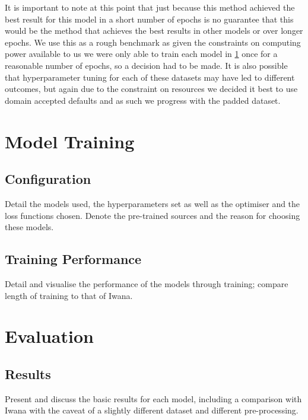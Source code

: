 \documentclass[12pt]{article}
\numberwithin{equation}{section}
\numberwithin{figure}{section}
\begin{document}
It is important to note at this point that just because this method achieved the best result for this model in a short number of epochs is no guarantee that this would be the method that achieves the best results in other models or over longer epochs. We use this as a rough benchmark as given the constraints on computing power available to us we were only able to train each model in \cref{sec:Model_Training} once for a reasonable number of epochs, so a decision had to be made. It is also possible that hyperparameter tuning for each of these datasets may have led to different outcomes, but again due to the constraint on resources we decided it best to use domain accepted defaults and as such we progress with the padded dataset.

\section{Model Training} 
\label{sec:Model_Training} 
\subsection{Configuration} 
\label{sub:Configuration} 
Detail the models used, the hyperparameters set as well as the optimiser and the loss functions chosen. Denote the pre-trained sources and the reason for choosing these models.
\subsection{Training Performance} 
\label{sub:Training_Performance} 
Detail and visualise the performance of the models through training; compare length of training to that of Iwana.


\section{Evaluation} 
\label{sec:Evaluation_and_Further_Exploration} 
\subsection{Results} 
\label{sub:Results} 
Present and discuss the basic results for each model, including a comparison with Iwana with the caveat of a slightly different dataset and different pre-processing. 
\end{document}
